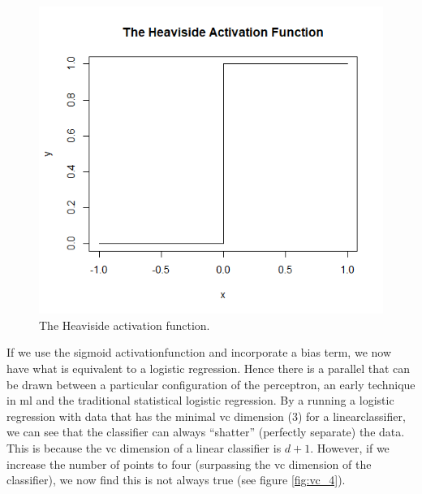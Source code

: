 \begin{figure}
    \includegraphics[scale=0.5]{figs/heavi.png}
    \caption{The Heaviside activation function.}
    \label{fig:heavi_function}
\end{figure}

If we use the sigmoid \gls{activationfunction} and incorporate a bias term, we now have what is equivalent to a logistic regression. Hence there is a parallel that can be drawn between a particular configuration of the perceptron, an early technique in \gls{ml} and the traditional statistical logistic regression. By a running a logistic regression with data that has the minimal \gls{vc} dimension (3) for a \gls{linearclassifier}, we can see that the classifier can always \enquote{shatter} (perfectly separate) the data. This is because the \gls{vc} dimension of a linear classifier is $d+1$. However, if we increase the number of points to four (surpassing the \gls{vc} dimension of the classifier), we now find this is not always true (see figure \ref{fig:vc_4}).

